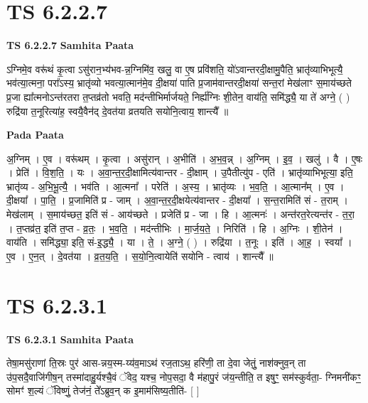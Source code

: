 \documentclass[17pt]{extarticle}
\begin{document}
\section*{ TS 6.2.2.7 }

\textbf{TS 6.2.2.7 } \newline
\textbf{Samhita Paata} \newline

ऽग्निमे॒व वरू॑थं कृ॒त्वा ऽसु॑रान॒भ्य॑भव-न्न॒ग्निमि॑व॒ खलु॒ वा ए॒ष प्रवि॑शति॒ यो॑ऽवान्तरदी॒क्षामु॒पैति॒ भ्रातृ॑व्याभिभूत्यै॒ भव॑त्या॒त्मना॒ परा᳚ऽस्य॒ भ्रातृ॑व्यो भवत्या॒त्मान॑मे॒व दी॒क्षया॑ पाति प्र॒जाम॑वान्तरदी॒क्षया॑ सन्त॒रां मेख॑लाꣳ स॒माय॑च्छते प्र॒जा ह्या᳚त्मनोऽन्त॑रतरा त॒प्तव्र॑तो भवति॒ मद॑न्तीभिर्मार्जयते॒ निर्ह्य॑ग्निः शी॒तेन॒ वाय॑ति॒ समि॑द्ध्यै॒ या ते॑ अग्ने॒ ( ) रुद्रि॑या त॒नूरित्या॑ह॒ स्वयै॒वैन॑द् दे॒वत॑या व्रतयति सयोनि॒त्वाय॒ शान्त्यै᳚ ॥ \newline

\textbf{Pada Paata} \newline

अ॒ग्निम् । ए॒व । वरू॑थम् । कृ॒त्वा । असु॑रान् । अ॒भीति॑ । अ॒भ॒व॒न्न् । अ॒ग्निम् । इ॒व॒ । खलु॑ । वै । ए॒षः । प्रेति॑ । वि॒श॒ति॒ । यः । अ॒वा॒न्त॒र॒दी॒क्षामित्य॑वान्तर - दी॒क्षाम् । उ॒पैतीत्यु॑प - एति॑ । भ्रातृ॑व्याभिभूत्या॒ इति॒ भ्रातृ॑व्य - अ॒भि॒भू॒त्यै॒ । भव॑ति । आ॒त्मना᳚ । परेति॑ । अ॒स्य॒ । भ्रातृ॑व्यः । भ॒व॒ति॒ । आ॒त्मान᳚म् । ए॒व । दी॒क्षया᳚ । पा॒ति॒ । प्र॒जामिति॑ प्र - जाम् । अ॒वा॒न्त॒र॒दी॒क्षयेत्य॑वान्तर - दी॒क्षया᳚ । स॒न्त॒रामिति॑ सं - त॒राम् । मेख॑लाम् । स॒माय॑च्छत॒ इति॑ सं - आय॑च्छते । प्रजेति॑ प्र - जा । हि । आ॒त्मनः॑ । अन्त॑रत॒रेत्यन्त॑र - त॒रा॒ । त॒प्तव्र॑त॒ इति॑ त॒प्त - व्र॒तः॒ । भ॒व॒ति॒ । मद॑न्तीभिः । मा॒र्ज॒य॒ते॒ । निरिति॑ । हि । अ॒ग्निः । शी॒तेन॑ । वाय॑ति । समि॑द्ध्या॒ इति॒ सं-इ॒द्ध्यै॒ । या । ते॒ । अ॒ग्ने॒ ( ) । रुद्रि॑या । त॒नूः । इति॑ । आ॒ह॒ । स्वया᳚ । ए॒व । ए॒न॒त् । दे॒वत॑या । व्र॒त॒य॒ति॒ । स॒यो॒नि॒त्वायेति॑ सयोनि - त्वाय॑ । शान्त्यै᳚ ॥  \newline




\section*{ TS 6.2.3.1 }

\textbf{TS 6.2.3.1 } \newline
\textbf{Samhita Paata} \newline

तेषा॒मसु॑राणां ति॒स्रः पुर॑ आस-न्नय॒स्म-य्य॑व॒माऽथ॑ रज॒ताऽथ॒ हरि॑णी॒ ता दे॒वा जेतुं॒ नाश॑क्नुव॒न् ता उ॑प॒सदै॒वाजि॑गीष॒न् तस्मा॑दाहु॒र्यश्चै॒वं ॅवेद॒ यश्च॒ नोप॒सदा॒ वै म॑हापु॒रं ज॑य॒न्तीति॒ त इषुꣳ॒॒ सम॑स्कुर्वता॒- ग्निमनी॑कꣳ॒॒ सोमꣳ॑ श॒ल्यं ॅविष्णुं॒ तेज॑नं॒ ते᳚ऽब्रुव॒न् क इ॒माम॑सिष्य॒तीति॑- [  ] \newline
\end{document}

